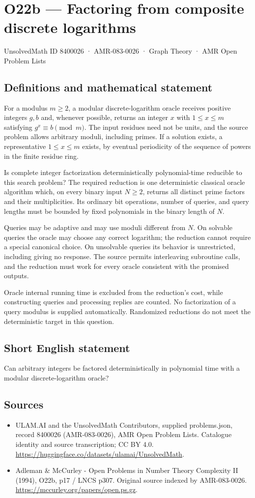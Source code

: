 \documentclass[11pt,a4paper]{article}
\begin{document}
\section*{O22b — Factoring from composite discrete logarithms}\label{8400026}
{\small UnsolvedMath ID 8400026 · AMR-083-0026 · Graph Theory · AMR Open Problem Lists}
\subsection{Definitions and mathematical statement}
For a modulus $m\ge2$, a modular discrete-logarithm oracle receives positive integers $g,b$ and, whenever possible, returns an integer $x$ with $1\le x\le m$ satisfying $g^x\equiv b\pmod m$. The input residues need not be units, and the source problem allows arbitrary moduli, including primes. If a solution exists, a representative $1\le x\le m$ exists, by eventual periodicity of the sequence of powers in the finite residue ring.

Is complete integer factorization deterministically polynomial-time reducible to this search problem? The required reduction is one deterministic classical oracle algorithm which, on every binary input $N\ge2$, returns all distinct prime factors and their multiplicities. Its ordinary bit operations, number of queries, and query lengths must be bounded by fixed polynomials in the binary length of $N$.

Queries may be adaptive and may use moduli different from $N$. On solvable queries the oracle may choose any correct logarithm; the reduction cannot require a special canonical choice. On unsolvable queries its behavior is unrestricted, including giving no response. The source permits interleaving subroutine calls, and the reduction must work for every oracle consistent with the promised outputs.

Oracle internal running time is excluded from the reduction's cost, while constructing queries and processing replies are counted. No factorization of a query modulus is supplied automatically. Randomized reductions do not meet the deterministic target in this question.
\subsection{Short English statement}
Can arbitrary integers be factored deterministically in polynomial time with a modular discrete-logarithm oracle?
\subsection{Sources}
\begin{itemize}
\item[S1] ULAM.AI and the UnsolvedMath Contributors, supplied problems.json, record 8400026 (AMR-083-0026), AMR Open Problem Lists. Catalogue identity and source transcription; CC BY 4.0.
\url{https://huggingface.co/datasets/ulamai/UnsolvedMath}.
\item[S2] Adleman \& McCurley - Open Problems in Number Theory Complexity II (1994), O22b, p17 / LNCS p307. Original source indexed by AMR-083-0026.
\url{https://mccurley.org/papers/open.ps.gz}.
\end{itemize}
\end{document}
